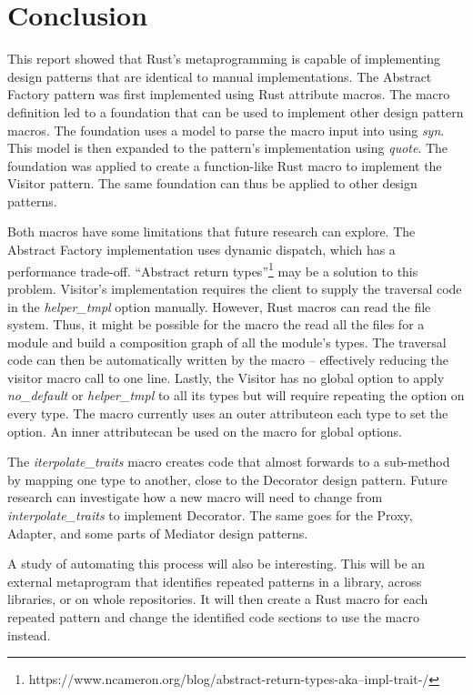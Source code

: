 \section{Conclusion}
This report showed that Rust's metaprogramming is capable of implementing design patterns that are identical to manual implementations.
The Abstract Factory pattern was first implemented using Rust attribute macros.
The macro definition led to a foundation that can be used to implement other design pattern macros.
The foundation uses a model to parse the macro input into using \textit{syn}.
This model is then expanded to the pattern's implementation using \textit{quote}.
The foundation was applied to create a function-like Rust macro to implement the Visitor pattern.
The same foundation can thus be applied to other design patterns.

Both macros have some limitations that future research can explore.
The Abstract Factory implementation uses dynamic dispatch, which has a performance trade-off.
``Abstract return types''\footnote{https://www.ncameron.org/blog/abstract-return-types-aka--impl-trait-/} may be a solution to this problem.
Visitor's implementation requires the client to supply the traversal code in the \textit{helper\_tmpl} option manually.
However, Rust macros can read the file system.
Thus, it might be possible for the macro the read all the files for a module and build a composition graph of all the module's types.
The traversal code can then be automatically written by the macro -- effectively reducing the visitor macro call to one line.
Lastly, the Visitor has no global option to apply \textit{no\_default} or \textit{helper\_tmpl} to all its types but will require repeating the option on every type.
The macro currently uses an outer attribute\footnotemark on each type to set the option.
An inner attribute\footnotemark[\value{footnote}] can be used on the macro for global options.

The \textit{iterpolate\_traits} macro creates code that almost forwards to a sub-method by mapping one type to another, close to the Decorator design pattern.
Future research can investigate how a new macro will need to change from \textit{interpolate\_traits} to implement Decorator.
The same goes for the Proxy, Adapter, and some parts of Mediator design patterns.

A study of automating this process will also be interesting.
This will be an external metaprogram that identifies repeated patterns in a library, across libraries, or on whole repositories.
It will then create a Rust macro for each repeated pattern and change the identified code sections to use the macro instead.

